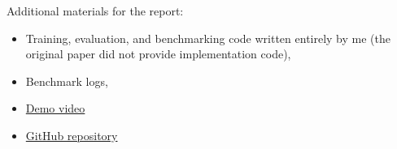 \documentclass{article}
\begin{document}
Additional materials for the report:
\begin{itemize}
    \item Training, evaluation, and benchmarking code written entirely by me (the original paper did not provide implementation code),
    \item Benchmark logs,
    \item \href{https://youtu.be/XVWqi8_S1Xc}{Demo video}
    \item \href{https://github.com/grishnakov/176-final-project-alexey-grishakov}{GitHub repository}
\end{itemize}



\end{document}
